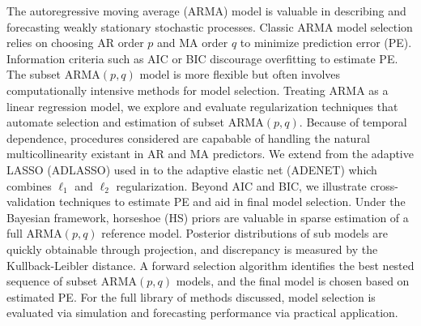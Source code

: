 The autoregressive moving average (ARMA) model is valuable in describing and forecasting weakly stationary stochastic processes. Classic ARMA model selection relies on choosing AR order $p$ and MA order $q$ to minimize prediction error (PE). Information criteria such as AIC or BIC discourage overfitting to estimate PE. The subset ARMA$(p,q)$ model is more flexible but often involves  computationally intensive methods for model selection. Treating ARMA as a linear regression model, we explore and evaluate regularization techniques that automate selection and estimation of subset ARMA$(p,q)$. Because of temporal dependence, procedures considered are capabable of handling the natural multicollinearity existant in AR and MA predictors. We extend from the adaptive LASSO (ADLASSO) used in \cite{Chen2011} to the adaptive elastic net (ADENET) which combines $\ell_1$ and $\ell_2$ regularization. Beyond AIC and BIC, we illustrate cross-validation techniques to estimate PE and aid in final model selection. Under the Bayesian framework, horseshoe (HS) priors are valuable in sparse estimation of a full ARMA$(p,q)$ reference model. Posterior distributions of sub models are quickly obtainable through projection, and discrepancy is measured by the Kullback-Leibler distance. A forward selection algorithm identifies the best nested sequence of subset ARMA$(p,q)$ models, and the final model is chosen based on estimated PE. For the full library of methods discussed, model selection is evaluated via simulation and forecasting performance via practical application.